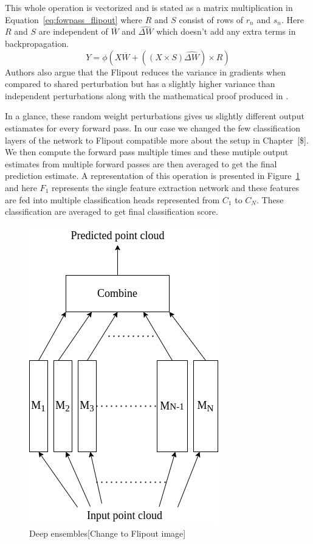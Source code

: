 This whole operation is vectorized and is stated as a matrix multiplication in Equation~\ref{eq:fowpass_flipout} where $R$ and $S$ consist of rows of $r_n$ and $s_n$.
Here $R$ and $S$ are independent of $\overline{W}$ and $\widehat{\Delta W}$ which doesn't add any extra terms in backpropagation.
\begin{equation}
    Y = \phi(X\overline{W}+((X\times S)\widehat{\Delta W})\times R)
    \label{eq:fowpass_flipout}
\end{equation}
Authors also argue that the Flipout reduces the variance in gradients when compared to shared perturbation but has a slightly higher variance than independent perturbations along with the mathematical proof produced in \cite{Flipout}.


In a glance, these random weight perturbations gives us slightly different output estiamates for every forward pass.
In our case we changed the few classification layers of the network to Flipout compatible  more about the setup in Chapter~[\$].
We then compute the forward pass multiple times and these mutiple output estimates from multiple forward passes are then averaged to get the final prediction estimate.
A representation of this operation is presented in Figure~\ref{fig:flipout_ex} and here $F_1$ represents the single feature extraction network and these features are fed into multiple classification heads represented from $C_1$ to $C_N$.
These classification are averaged to get final classification score.
\begin{figure}
    \centering
    \includegraphics[scale=0.5]{images/Ensembles.png}
    \caption{Deep ensembles[Change to Flipout image]}
    \label{fig:flipout_ex}
\end{figure}
\FloatBarrier

